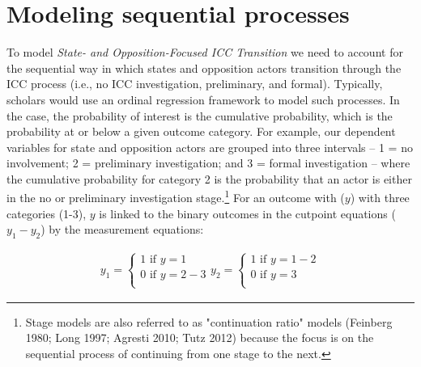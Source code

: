 

\section*{Modeling sequential processes}

To model \emph{State- and Opposition-Focused ICC Transition} we need to account for the sequential way in which states and opposition actors transition through the ICC process (i.e., no ICC investigation, preliminary, and formal). Typically, scholars would use an ordinal regression framework to model such processes. In the case, the probability of interest is the cumulative probability, which is the probability at or below a given outcome category. For example, our dependent variables for state and opposition actors are grouped into three intervals -- 1 = no involvement; 2 = preliminary investigation; and 3 = formal investigation -- where the cumulative probability for category 2 is the probability that an actor is either in the no or preliminary investigation stage.\footnote{Stage models are also referred to as "continuation ratio" models (Feinberg 1980; Long 1997; Agresti 2010; Tutz 2012) because the focus is on the sequential process of continuing from one stage to the next.} For an outcome with ($y$) with three categories (1-3), $y$ is linked to the binary outcomes in the cutpoint equations ($y_{1} - y_{2}$) by the measurement equations:

\begin{eqnarray}
	y_{1} =
	\begin{cases}
		1 \text{ if } y = 1 \nonumber \\
		0 \text{ if } y = 2-3 \nonumber \\
	\end{cases}
	y_{2} =
	\begin{cases}
		1 \text{ if } y = 1-2 \nonumber \\
		0 \text{ if } y = 3 \nonumber \\
	\end{cases}
\end{eqnarray}

